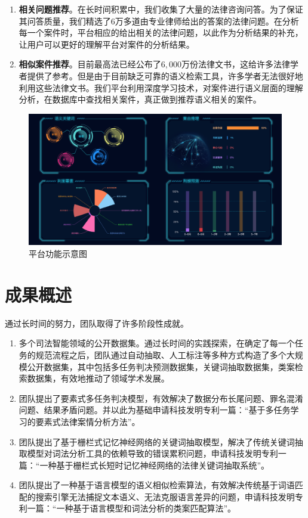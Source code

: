 \begin{enumerate}[1)]
	\item \textbf{相关问题推荐}。在长时间积累中，我们收集了大量的法律咨询问答。为了保证其问答质量，我们精选了$6$万多道由专业律师给出的答案的法律问题。在分析每一个案件时，平台相应的给出相关的法律问题，以此作为分析结果的补充，让用户可以更好的理解平台对案件的分析结果。
	\item \textbf{相似案件推荐}。目前最高法已经公布了$6,000$万份法律文书，这给许多法律学者提供了参考。但是由于目前缺乏可靠的语义检索工具，许多学者无法很好地利用这些法律文书。我们平台利用深度学习技术，对案件进行语义层面的理解分析，在数据库中查找相关案件，真正做到推荐语义相关的案件。
	\end{enumerate}
	
\begin{figure}[ht]
    \centering
    \includegraphics[width=\linewidth]{figures/demo.png}
    \caption{平台功能示意图}
    \label{fig:demo}
\end{figure}


\section{成果概述}

通过长时间的努力，团队取得了许多阶段性成就。

\begin{enumerate}[1)]
	\item 多个司法智能领域的公开数据集。通过长时间的实践探索，在确定了每一个任务的规范流程之后，团队通过自动抽取、人工标注等多种方式构造了多个大规模公开数据集，其中包括多任务判决预测数据集，关键词抽取数据集，类案检索数据集，有效地推动了领域学术发展。
	\item 团队提出了要素式多任务判决模型，有效解决了数据分布长尾问题、罪名混淆问题、结果矛盾问题。并以此为基础申请科技发明专利一篇：“基于多任务学习的要素式法律案情分析方法”。
	\item 团队提出了基于栅栏式记忆神经网络的关键词抽取模型，解决了传统关键词抽取模型对词法分析工具的依赖导致的错误累积问题，申请科技发明专利一篇：“一种基于栅栏式长短时记忆神经网络的法律关键词抽取系统”。
	\item 团队提出了一种基于语言模型的语义相似检索算法，有效解决传统基于词语匹配的搜索引擎无法捕捉文本语义、无法克服语言差异的问题，申请科技发明专利一篇：“一种基于语言模型和词法分析的类案匹配算法”。
\end{enumerate}

